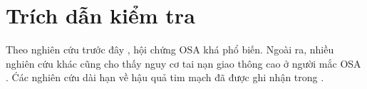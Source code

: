 \documentclass{article}
\begin{document}
\section*{Trích dẫn kiểm tra}

Theo nghiên cứu trước đây \cite{nguoimacOSA_VN}, hội chứng OSA khá phổ biến.
Ngoài ra, nhiều nghiên cứu khác cũng cho thấy nguy cơ tai nạn giao thông cao ở người mắc OSA \cite{osa_bike}.
\'Các nghiên cứu dài hạn về hậu quả tim mạch đã được ghi nhận trong \cite{Marin2005}.

\printbibliography
\end{document}
